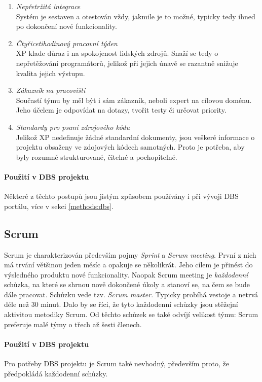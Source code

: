 \begin{enumerate}
	\item \emph{Nepřetržitá integrace}\\Systém je sestaven a otestován vždy, jakmile je to možné, typicky tedy ihned po dokončení nové funkcionality.
	\item \emph{Čtyřicetihodinový pracovní týden}\\XP klade důraz i na spokojenost lidských zdrojů. Snaží se tedy o nepřetěžování programátorů, jelikož při jejich únavě se razantně snižuje kvalita jejich výstupu.
	\item \emph{Zákazník na pracovišti}\\Součastí týmu by měl být i sám zákazník, neboli expert na cílovou doménu. Jeho účelem je odpovídat na dotazy, tvořit testy či určovat priority.
	\item \emph{Standardy pro psaní zdrojového kódu}\\Jelikož XP nedefinuje žádné standardní dokumenty, jsou veškeré informace o projektu obsaženy ve zdojových kódech samotných. Proto je potřeba, aby byly rozumně strukturované, čitelné a pochopitelné.
\end{enumerate}

\paragraph{Použití v DBS projektu}
Některé z těchto postupů jsou jistým způsobem používány i při vývoji DBS portálu, více v sekci \ref{methods:dbs}.


\subsection{Scrum} \label{methods:scrum}

Scrum je charakterizován především pojmy \emph{Sprint} a \emph{Scrum meeting}. První z nich má trvání většinou jeden měsíc a opakuje se několikrát. Jeho cílem je přinést do výsledného produktu nové funkcionality. Naopak Scrum meeting je \emph{každodenní} schůzka, na které se shrnou nově dokončené úkoly a stanoví se, na čem se bude dále pracovat. Schůzku vede tzv. \emph{Scrum master}. Typicky probíhá vestoje a netrvá déle než 30 minut. Dalo by se říci, že tyto každodenní schůzky jsou stěžejní aktivitou metodiky Scrum. Od těchto schůzek se také odvíjí velikost týmu: Scrum preferuje malé týmy o třech až šesti členech.

\paragraph{Použití v DBS projektu}
Pro potřeby DBS projektu je Scrum také nevhodný, především proto, že předpokládá každodenní schůzky.

